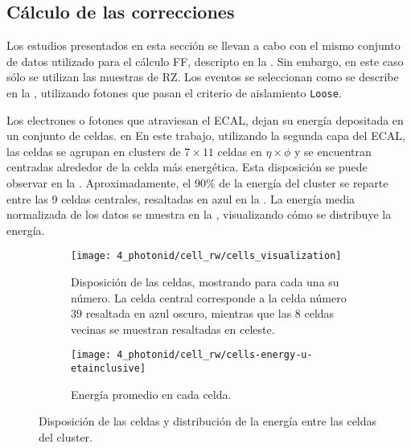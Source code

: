 \subsection{C\'alculo de las correcciones}
\label{subsec:ss_corrections:cell_rw:calculation}


Los estudios presentados en esta sección se llevan a cabo con el mismo conjunto de datos utilizado para el cálculo \ac{FF}, descripto en la \Sect{\ref{subsec:ss_corrections:ffs:samples}}. Sin embargo, en este caso sólo se utilizan las muestras de \ac{RZ}.
Los eventos se seleccionan como se describe en la \Sect{\ref{subsec:pid_ss:pid:event_selection}}, utilizando fotones que pasan el criterio de aislamiento \texttt{Loose}.

Los electrones o fotones que atraviesan el \ac{ECAL}, dejan su energ\'ia depositada en un conjunto de celdas. en En este trabajo, utilizando la segunda capa del \ac{ECAL}, las celdas se agrupan en clusters de \(7\times 11\) celdas en \(\eta\times\phi\) y se encuentran centradas alrededor de la celda m\'as energ\'etica. Esta disposici\'on se puede observar en la \Fig{\ref{fig:ss_corrections:cell_rw:event_selection:cluster:arrangement}}. Aproximadamente, el \(90\%\) de la energ\'ia del cluster se reparte entre las 9 celdas centrales, resaltadas en azul en la \Fig{\ref{fig:ss_corrections:cell_rw:event_selection:cluster:arrangement}}. La energ\'ia media normalizada de los datos se muestra en la \Fig{\ref{fig:ss_corrections:cell_rw:event_selection:cluster:energy}}, visualizando c\'omo se distribuye la energ\'ia.

\begin{figure}[ht!]
    \centering
    \begin{subfigure}[t]{0.49\linewidth}
        \centering
        \texttt{[image: 4\_photonid/cell\_rw/cells\_visualization]}
        \caption{Disposici\'on de las celdas, mostrando para cada una su n\'umero. La celda central corresponde a la celda n\'umero 39 resaltada en azul oscuro, mientras que las 8 celdas vecinas se muestran resaltadas en celeste.}
        \label{fig:ss_corrections:cell_rw:event_selection:cluster:arrangement}
    \end{subfigure}
    \hfill
    \begin{subfigure}[t]{0.49\linewidth}
        \centering
        \texttt{[image: 4\_photonid/cell\_rw/cells-energy-u-etainclusive]}
        \caption{Energ\'ia promedio en cada celda.}
        \label{fig:ss_corrections:cell_rw:event_selection:cluster:energy}
    \end{subfigure}
    \caption{Disposici\'on de las celdas y distribuci\'on de la energ\'ia entre las celdas del cluster.}
    \label{fig:ss_corrections:cell_rw:event_selection:cluster}
\end{figure}


